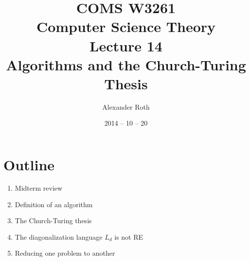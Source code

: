 \documentclass[]{article}
\begin{document}
\newcommand*{\xml}[1]{\texttt{<#1>}}
\theoremstyle{definition}
\newtheorem{thm}{Theorem}
\title{COMS W3261 \\ Computer Science Theory \\ Lecture 14\\ Algorithms and the
Church-Turing Thesis}
\author{Alexander Roth}
\date{2014 -- 10 -- 20}
\maketitle
\section*{Outline}
  \begin{enumerate}
    \item Midterm review
    \item Definition of an algorithm
    \item The Church-Turing thesis
    \item The diagonalization language $L_d$ is not RE
    \item Reducing one problem to another
  \end{enumerate}
\end{document}
